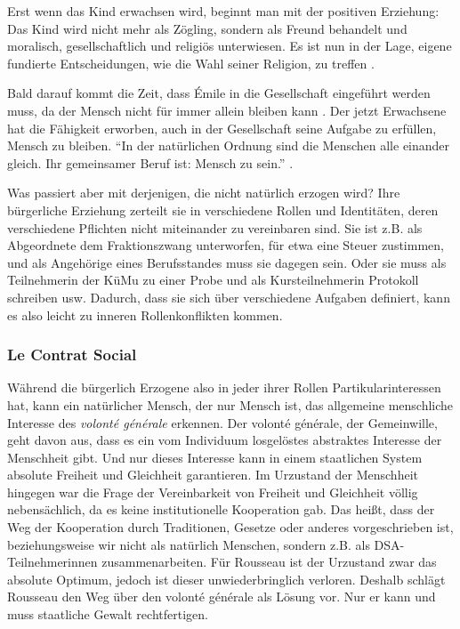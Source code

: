 Erst wenn das Kind erwachsen wird, beginnt man mit der positiven Erziehung:
Das Kind wird nicht mehr als Zögling, sondern als Freund behandelt und moralisch, gesellschaftlich und religiös unterwiesen.
Es ist nun in der Lage, eigene fundierte Entscheidungen, wie die Wahl seiner Religion, zu treffen \parencite[60f.]{rousseau-1762}.

Bald darauf kommt die Zeit, dass Émile in die Gesellschaft eingeführt werden muss, da der Mensch nicht für immer allein bleiben kann \parencite[61]{rousseau-1762}.
Der jetzt Erwachsene hat die Fähigkeit erworben, auch in der Gesellschaft seine Aufgabe zu erfüllen, Mensch zu bleiben.
``In der natürlichen Ordnung sind die Menschen alle einander gleich. Ihr gemeinsamer Beruf ist: Mensch zu sein.''
\parencite[50]{rousseau-1762}.

Was passiert aber mit derjenigen, die nicht natürlich erzogen wird?
Ihre bürgerliche Erziehung zerteilt sie in verschiedene Rollen und Identitäten, deren verschiedene Pflichten nicht miteinander zu vereinbaren sind.
Sie ist z.B. als Abgeordnete dem Fraktionszwang unterworfen, für etwa eine Steuer zustimmen, und als Angehörige eines Berufsstandes muss sie dagegen sein.
Oder sie muss als Teilnehmerin der KüMu zu einer Probe und als Kursteilnehmerin Protokoll schreiben usw.
Dadurch, dass sie sich über verschiedene Aufgaben definiert, kann es also leicht zu inneren Rollenkonflikten kommen.


\subsubsection*{Le Contrat Social}

Während die bürgerlich Erzogene also in jeder ihrer Rollen Partikularinteressen hat, kann ein natürlicher Mensch, der nur Mensch ist, das allgemeine menschliche Interesse des \emph{volonté générale} erkennen.
Der volonté générale, der Gemeinwille, geht davon aus, dass es ein vom Individuum losgelöstes abstraktes Interesse der Menschheit gibt.
Und nur dieses Interesse kann in einem staatlichen System absolute Freiheit und Gleichheit garantieren.
Im Urzustand der Menschheit hingegen war die Frage der Vereinbarkeit von Freiheit und Gleichheit völlig nebensächlich, da es keine institutionelle Kooperation gab.
Das heißt, dass der Weg der Kooperation durch Traditionen, Gesetze oder anderes vorgeschrieben ist, beziehungsweise wir nicht als natürlich Menschen, sondern z.B. als DSA-Teilnehmerinnen zusammenarbeiten.
Für Rousseau ist der Urzustand zwar das absolute Optimum, jedoch ist dieser unwiederbringlich verloren.
Deshalb schlägt Rousseau den Weg über den volonté générale als Lösung vor.
Nur er kann und muss staatliche Gewalt rechtfertigen.

